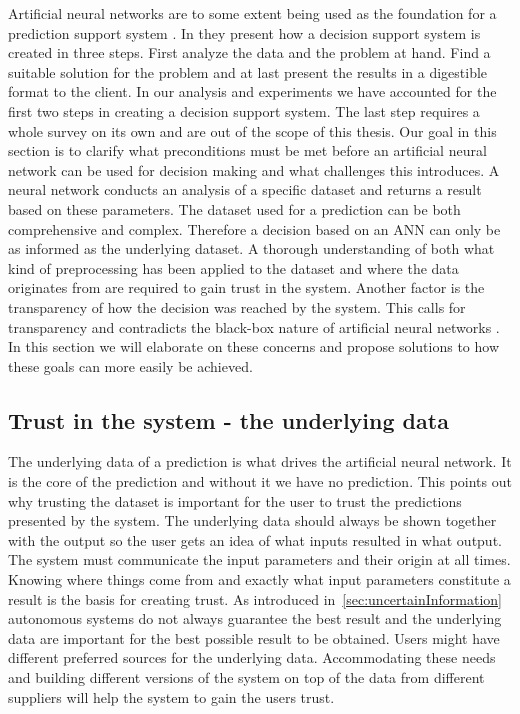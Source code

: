 Artificial neural networks are to some extent being used as the foundation for a prediction support system \cite{shim2002past}. In \cite{shim2002past} they present how a decision support system is created in three steps. First analyze the data and the problem at hand. Find a suitable solution for the problem and at last present the results in a digestible format to the client. In our analysis and experiments we have accounted for the first two steps in creating a decision support system. The last step requires a whole survey on its own and are out of the scope of this thesis. Our goal in this section is to clarify what preconditions must be met before an artificial neural network can be used for decision making and what challenges this introduces. A neural network conducts an analysis of a specific dataset and returns a result based on these parameters. The dataset used for a prediction can be both comprehensive and complex. Therefore a decision based on an ANN can only be as informed as the underlying dataset. A thorough understanding of both what kind of preprocessing has been applied to the dataset and where the data originates from are required to gain trust in the system. Another factor is the transparency of how the decision was reached by the system. This calls for transparency and contradicts the black-box nature of artificial neural networks \cite{fromBlackBoxToTransparentBox}. In this section we will elaborate on these concerns and propose solutions to how these goals can more easily be achieved.

\subsection{Trust in the system - the underlying data}
The underlying data of a prediction is what drives the artificial neural network. It is the core of the prediction and without it we have no prediction. This points out why trusting the dataset is important for the user to trust the predictions presented by the system. The underlying data should always be shown together with the output so the user gets an idea of what inputs resulted in what output. The system must communicate the input parameters and their origin at all times. Knowing where things come from and exactly what input parameters constitute a result is the basis for creating trust. As introduced in~\ref{sec:uncertainInformation} autonomous systems do not always guarantee the best result and the underlying data are important for the best possible result to be obtained. Users might have different preferred sources for the underlying data. Accommodating these needs and building different versions of the system on top of the data from different suppliers will help the system to gain the users trust.


